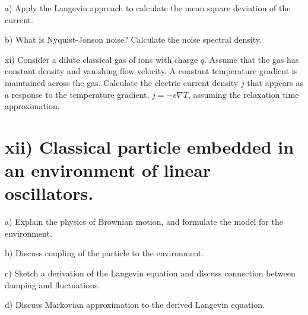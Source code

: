 \documentclass[UTF8]{ctexart}
\begin{document}
a) Apply the Langevin approach to calculate the mean square deviation of the current.

b) What is Nyquist-Jonson noise? Calculate the noise spectral density.

xi) Consider a dilute classical gas of ions with charge $q$. Assume that the gas has constant density and vanishing flow velocity. A constant temperature gradient is maintained across the gas. Calculate the electric current density $j$ that appears as a response to the temperature gradient, $j=-\epsilon \nabla T$, assuming the relaxation time approximation.

\section{xii) Classical particle embedded in an environment of linear oscillators.}

a) Explain the physics of Brownian motion, and formulate the model for the environment.

b) Discuss coupling of the particle to the environment.

c) Sketch a derivation of the Langevin equation and discuss connection between damping and fluctuations.

d) Discuss Markovian approximation to the derived Langevin equation.
\end{document}
